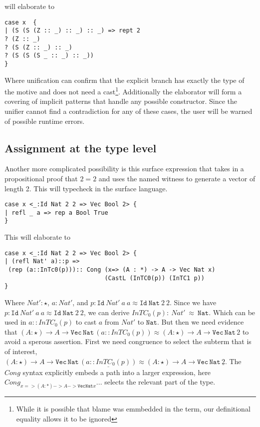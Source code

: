 will elaborate to
\begin{lstlisting}[basicstyle={\ttfamily\small}]
case x  {
| (S (S (Z :: _) :: _) :: _) => rept 2
? (Z :: _)
? (S (Z :: _) :: _)
? (S (S (S _ :: _) :: _))
}
\end{lstlisting}
 
Where unification can confirm that the explicit branch has exactly the type of the motive and does not need a cast\footnote{
  While it is possible that blame was emmbedded in the term, our definitional equality allows it to be ignored}.
Additionally the elaborator will form a covering of implicit patterns that handle any possible constructor.
Since the unifier cannot find a contradiction for any of these cases, the user will be warned of possible runtime errors.
 
\subsection{Assignment at the type level}
 
Another more complicated possibility is this surface expression that takes in a propositional proof that $2=2$ and uses the named witness to generate a vector of length 2.
This will typecheck in the surface language.
 
\begin{lstlisting}[basicstyle={\ttfamily\small}]
case x <_:Id Nat 2 2 => Vec Bool 2> {
| refl _ a => rep a Bool True
}
\end{lstlisting}
 
This will elaborate to
 
\begin{lstlisting}[basicstyle={\ttfamily\small}]
case x <_:Id Nat 2 2 => Vec Bool 2> {
| (refl Nat' a)::p =>
 (rep (a::InTc0(p))):: Cong (x=> (A : *) -> A -> Vec Nat x)
                            (CastL (InTC0(p)) (InTC1 p))
}
\end{lstlisting}
 
Where $Nat':\star$, $a:Nat'$, and $p:\mathtt{Id}\ Nat'\ a\ a\approx\mathtt{Id}\ \mathtt{Nat}\ 2\ 2$.
Since we have $p:\mathtt{Id}\ Nat'\ a\ a\approx\mathtt{Id}\ \mathtt{Nat}\ 2\ 2$, we can derive $InTC_{0}(p):\ Nat'\ \approx\ \mathtt{Nat}$.
Which can be used in $a::InTC_{0}(p)$ to cast $a$ from $Nat'$ to $\mathtt{Nat}$.
But then we need evidence that $(A:\star)\rightarrow A\rightarrow\mathtt{Vec}\,\mathtt{Nat}\,(a::InTC_{0}(p))\approx(A:\star)\rightarrow A\rightarrow\mathtt{Vec}\,\mathtt{Nat}\,2$ to avoid a sperous assertion.
First we need congruence to select the subterm that is of interest, $(A:\star)\rightarrow A\rightarrow\mathtt{Vec}\,\mathtt{Nat}\,\underline{(a::InTC_{0}(p))}\approx(A:\star)\rightarrow A\rightarrow\mathtt{Vec}\,\mathtt{Nat}\,\underline{2}$.
The $Cong$ syntax explicitly embeds a path into a larger expression, here $Cong_{x=> (A : *) -> A -> \mathtt{Vec} \mathtt{Nat} x} ...$ selects the relevant part of the type.
 
